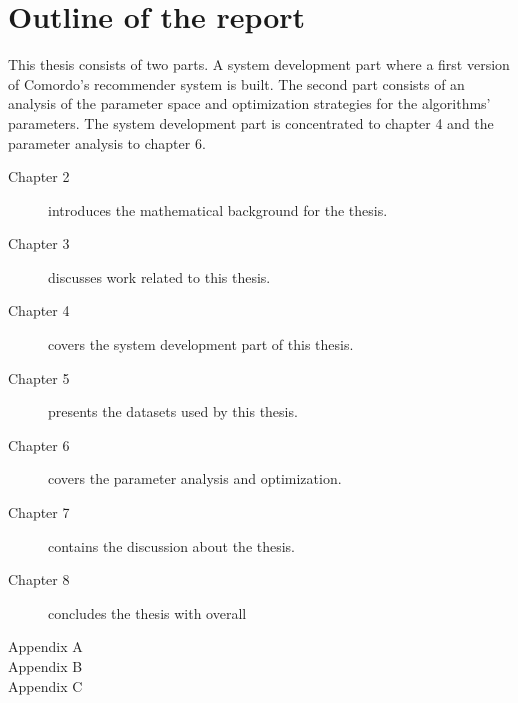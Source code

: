 
\section{Outline of the report}\label{sec:intro:outline}

This thesis consists of two parts. A system development part where a first version of Comordo's recommender system is built. The second part consists of an analysis of the parameter space and optimization strategies for the algorithms' parameters. The system development part is concentrated to chapter 4 and the parameter analysis to chapter 6.

\begin{description}
    \item[Chapter 2] introduces the mathematical background for the thesis.
    \item[Chapter 3] discusses work related to this thesis.
    \item[Chapter 4] covers the system development part of this thesis.
    \item[Chapter 5] presents the datasets used by this thesis.
    \item[Chapter 6] covers the parameter analysis and optimization.
    \item[Chapter 7] contains the discussion about the thesis.
    \item[Chapter 8] concludes the thesis with overall 
    \item[Appendix A] 
    \item[Appendix B] 
    \item[Appendix C] 
\end{description}


